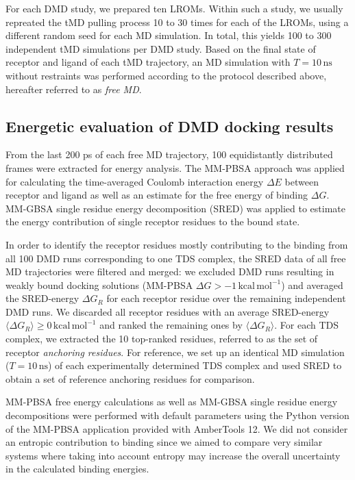 For each DMD study, we prepared ten LROMs. Within such a study, we usually
repreated the tMD pulling process 10 to 30 times for each of the LROMs, using a
different random seed for each MD simulation. In total, this yields 100 to 300
independent tMD simulations per DMD study. Based on the final state of receptor
and ligand of each tMD trajectory, an MD simulation with $T=10\,\mathrm{ns}$
without restraints was performed according to the protocol described above,
hereafter referred to as \textit{free MD}.


\subsection{Energetic evaluation of DMD docking results}

From the last 200 ps of each free MD trajectory, 100 equidistantly distributed
frames were extracted for energy analysis. The MM-PBSA \cite{mmpbsa_py} approach
was applied for calculating the time-averaged Coulomb interaction energy $\Delta
E$ between receptor and ligand as well as an estimate for the free energy of
binding $\Delta G$. MM-GBSA\cite{mmpbsa_py} single residue energy decomposition
(SRED) was applied to estimate the energy contribution of single receptor
residues to the bound state.

In order to identify the receptor residues mostly contributing to the binding
from all 100 DMD runs corresponding to one TDS complex, the SRED data of all
free MD trajectories were filtered and merged: we excluded DMD runs resulting in
weakly bound docking solutions (MM-PBSA $\Delta G >
-1\,\mathrm{kcal\,mol^{-1}}$) and averaged the SRED-energy $\Delta G_R$ for each
receptor residue over the remaining independent DMD runs. We discarded all
receptor residues with an average SRED-energy $\langle\Delta G_R\rangle \ge
0\,\mathrm{kcal\,mol^{-1}}$ and ranked the remaining ones by $\langle\Delta
G_R\rangle$. For each TDS complex, we extracted the 10 top-ranked residues,
referred to as the set of receptor \textit{anchoring residues}. For reference,
we set up an identical MD simulation ($T=10\,\mathrm{ns}$) of each
experimentally determined TDS complex and used SRED to obtain a set of reference
anchoring residues for comparison.

MM-PBSA free energy calculations as well as MM-GBSA single residue energy
decompositions were performed with default parameters using the Python version
of the MM-PBSA application provided with AmberTools 12. We did not consider an
entropic contribution to binding since we aimed to compare very similar systems
where taking into account entropy may increase the overall uncertainty in the
calculated binding energies{\cite{Gandhi01102009, homeyer_gohlke_2012}}.

